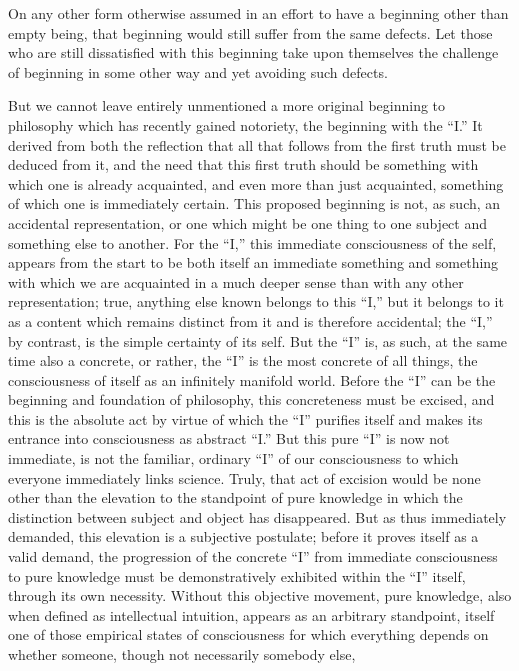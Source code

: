 On any other form otherwise assumed
in an effort to have a beginning
other than empty being,
that beginning would still
suffer from the same defects.
Let those who are still dissatisfied
with this beginning take upon themselves
the challenge of beginning in some other way
and yet avoiding such defects.

But we cannot leave entirely unmentioned a more original
beginning to philosophy which has recently gained notoriety,
the beginning with the “I.”
It derived from both the reflection that
all that follows from the first truth must be deduced from it,
and the need that this first truth should be
something with which one is already acquainted,
and even more than just acquainted,
something of which one is immediately certain.
This proposed beginning is not, as such, an accidental representation,
or one which might be one thing to one subject and something else to another.
For the “I,” this immediate consciousness of the self,
appears from the start to be both itself
an immediate something and something with which
we are acquainted in a much deeper sense than with any other representation;
true, anything else known belongs to this “I,”
but it belongs to it as a content which remains
distinct from it and is therefore accidental;
the “I,” by contrast, is the simple certainty of its self.
But the “I” is, as such, at the same time also a concrete,
or rather, the “I” is the most concrete of all things,
the consciousness of itself as an infinitely manifold world.
Before the “I” can be the beginning and foundation of philosophy,
this concreteness must be excised,
and this is the absolute act by virtue of which
the “I” purifies itself and makes its entrance
into consciousness as abstract “I.”
But this pure “I” is now not immediate,
is not the familiar, ordinary “I” of our consciousness
to which everyone immediately links science.
Truly, that act of excision would be
none other than the elevation to the standpoint of pure knowledge in
which the distinction between subject and object has disappeared.
But as thus immediately demanded, this elevation is a subjective postulate;
before it proves itself as a valid demand,
the progression of the concrete “I”
from immediate consciousness to pure knowledge must be demonstratively
exhibited within the “I” itself,
through its own necessity.
Without this objective movement, pure knowledge,
also when defined as intellectual intuition,
appears as an arbitrary standpoint,
itself one of those empirical states of consciousness
for which everything depends on whether someone,
though not necessarily somebody else,
